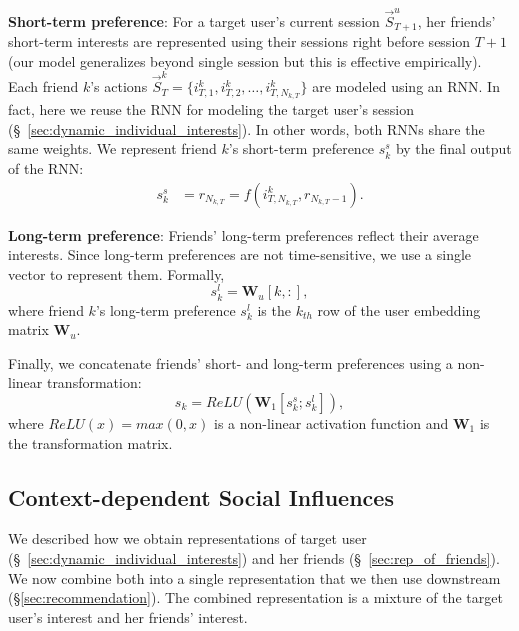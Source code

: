 \documentclass[sigconf]{acmart}
\begin{document}
\textbf{Short-term preference}: For a target user's current session $\vec{S}_{T+1}^u$, her friends' short-term interests are represented 
using their sessions right before session $T+1$ (our model generalizes beyond single session but this is effective empirically). Each friend $k$'s actions $\vec{S}_{T}^k=\{i_{T,1}^{k}, i_{T,2}^{k},\ldots, i_{T,N_{k,T}}^{k}\}$ are modeled using an RNN. In fact, here we reuse the RNN for modeling the target user's session (\S~\ref{sec:dynamic_individual_interests}). In other words, both RNNs share the same weights.
We represent friend $k$'s short-term preference $s_k^s$ by the final output of the RNN:
\begin{equation}
\begin{aligned}
s_k^s &= r_{N_{k,T}} = f(i_{T, N_{k,T}}^{k}, r_{N_{k,T}-1}).
\end{aligned}
\end{equation}

\textbf{Long-term preference}: Friends' long-term preferences reflect their average interests.
Since long-term preferences are not time-sensitive, we use a single vector to represent them. Formally,
\begin{equation}
s_k^l = \mathbf{W}_u[k,:],
\end{equation}
where friend $k$'s long-term preference $s_k^l$ is the $k_{th}$ row of the user embedding matrix $\textbf{W}_u$.

Finally, we concatenate friends' short- and long-term preferences using a non-linear transformation:
\begin{equation}\label{eqa:long_short}
s_k = ReLU(\mathbf{W}_1[s_k^{s};s_k^{l}]),
\end{equation}
where $ReLU(x)=max(0,x)$ is a non-linear activation function and $\textbf{W}_1$ is the transformation matrix.

\subsection{Context-dependent Social Influences}\label{sec:context_dependent_social_influences}
We described how we obtain representations of target user (\S~\ref{sec:dynamic_individual_interests}) and her friends (\S~\ref{sec:rep_of_friends}). We now combine both into a single representation that we then use downstream (\S \ref{sec:recommendation}). The combined representation is a mixture of the target user's interest and her friends' interest. 
\end{document}

